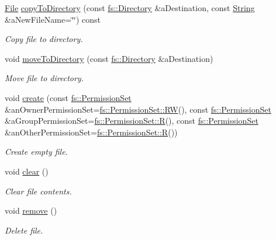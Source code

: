 \begin{DoxyCompactItemize}
\hyperlink{classostk_1_1core_1_1fs_1_1_file}{File} \hyperlink{classostk_1_1core_1_1fs_1_1_file_aab6e069ef912f0ffe6203a9eb32a16d7}{copy\+To\+Directory} (const \hyperlink{classostk_1_1core_1_1fs_1_1_directory}{fs\+::\+Directory} \&a\+Destination, const \hyperlink{classostk_1_1core_1_1types_1_1_string}{String} \&a\+New\+File\+Name=\char`\"{}\char`\"{}) const
\begin{DoxyCompactList}\small\item\em Copy file to directory. \end{DoxyCompactList}\item 
void \hyperlink{classostk_1_1core_1_1fs_1_1_file_a30689af3e982cf9ae611312695b812ab}{move\+To\+Directory} (const \hyperlink{classostk_1_1core_1_1fs_1_1_directory}{fs\+::\+Directory} \&a\+Destination)
\begin{DoxyCompactList}\small\item\em Move file to directory. \end{DoxyCompactList}\item 
void \hyperlink{classostk_1_1core_1_1fs_1_1_file_ad02a3565af878feb290667b071497749}{create} (const \hyperlink{classostk_1_1core_1_1fs_1_1_permission_set}{fs\+::\+Permission\+Set} \&an\+Owner\+Permission\+Set=\hyperlink{classostk_1_1core_1_1fs_1_1_permission_set_ad58bc0911ca89d3c03c089f1647d0315}{fs\+::\+Permission\+Set\+::\+RW}(), const \hyperlink{classostk_1_1core_1_1fs_1_1_permission_set}{fs\+::\+Permission\+Set} \&a\+Group\+Permission\+Set=\hyperlink{classostk_1_1core_1_1fs_1_1_permission_set_a400f8be607966c0a42597f5cef062210}{fs\+::\+Permission\+Set\+::R}(), const \hyperlink{classostk_1_1core_1_1fs_1_1_permission_set}{fs\+::\+Permission\+Set} \&an\+Other\+Permission\+Set=\hyperlink{classostk_1_1core_1_1fs_1_1_permission_set_a400f8be607966c0a42597f5cef062210}{fs\+::\+Permission\+Set\+::R}())
\begin{DoxyCompactList}\small\item\em Create empty file. \end{DoxyCompactList}\item 
void \hyperlink{classostk_1_1core_1_1fs_1_1_file_a10f822f5146c5ee5fe43e35bfd39f88e}{clear} ()
\begin{DoxyCompactList}\small\item\em Clear file contents. \end{DoxyCompactList}\item 
void \hyperlink{classostk_1_1core_1_1fs_1_1_file_a08ab15296e2baa61e7a023514cb46f31}{remove} ()
\begin{DoxyCompactList}\small\item\em Delete file. \end{DoxyCompactList}\end{DoxyCompactItemize}
